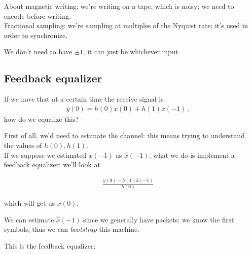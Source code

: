 \documentclass[a4paper, 12pt]{book}
\begin{document}
\begin{tcolorbox}[colback=obsidianGreen, colframe=white, boxrule=0pt, sharp corners]
About magnetic writing; we're writing on a tape, which is noisy; we need to encode before writing.\\
Fractional sampling: we're sampling at multiples of the Nyquist rate; it's used in order to synchronize.
\end{tcolorbox}

\begin{tcolorbox}[colback=obsidianGreen, colframe=white, boxrule=0pt, sharp corners]
We don't need to have $\pm 1$, it can just be whichever input.
\end{tcolorbox}

\subsection{Feedback equalizer}

If we have that at a certain time the receive signal is
\begin{align}
    y(0) = h(0)x(0) + h(1)x(-1) \,,
\end{align}
how do we equalize this?

First of all, we'd need to estimate the channel: this means trying to understand the values of $h(0), h(1)$.\\
If we suppose we estimated $x(-1)$ as $\hat{x}(-1)$, what we do is implement a feedback equalizer: we'll look at

\begin{align}
    \frac{y(0) - h(1)\hat{x}(-1)}{h(0)}
\end{align}

which will get us $x(0)$.

We can estimate $\hat{x}(-1)$ since we generally have packets: we know the first symbols, thus we can \textit{bootstrap} this machine.

This is the feedback equalizer:
\begin{center}
\end{center}
\end{document}
